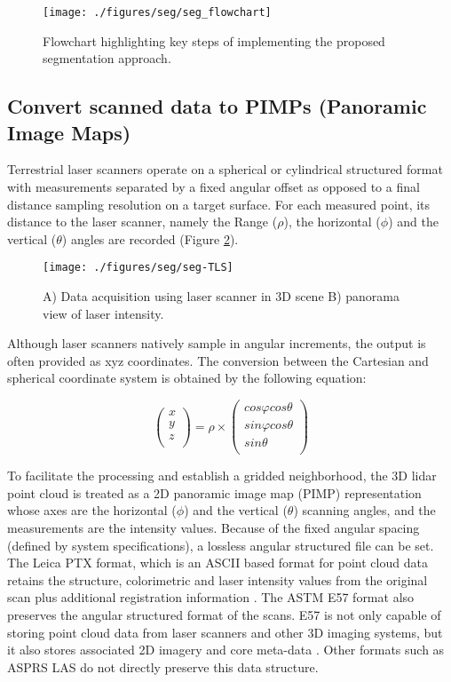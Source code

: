 \documentclass[final,3p,times,twocolumn,authoryear]{elsarticle}
\begin{document}
\begin{figure}
	\centering
	\texttt{[image: ./figures/seg/seg\_flowchart]}
	\caption{Flowchart highlighting key steps of implementing the proposed segmentation approach.}
	\label{fig:seg_flowchart}
\end{figure}


\subsection{Convert scanned data to PIMPs (Panoramic Image Maps)}

Terrestrial laser scanners operate on a spherical or cylindrical structured format with measurements separated by a fixed angular offset as opposed to a final distance sampling resolution on a target surface. For each measured point, its distance to the laser scanner, namely the Range ($\rho$), the horizontal ($\phi$) and the vertical ($\theta$) angles are recorded (Figure \ref{fig:seg-TLS}).

\begin{figure}
	\centering
	\texttt{[image: ./figures/seg/seg-TLS]}
	\caption{A) Data acquisition using laser scanner in 3D scene B) panorama view of laser intensity.}
	\label{fig:seg-TLS}
\end{figure}

Although laser scanners natively sample in angular increments, the output is often provided as xyz coordinates. The conversion between the Cartesian and spherical coordinate system is obtained by the following equation: 

\begin{equation}
\left( \begin{matrix}
x  \\
y  \\
z  \\
\end{matrix} \right)=\rho \times \left( \begin{matrix}
cos\varphi cos\theta   \\
sin\varphi cos\theta   \\
sin\theta   \\
\end{matrix} \right)
\end{equation}

To facilitate the processing and establish a gridded neighborhood, the 3D lidar point cloud is treated as a 2D panoramic image map (PIMP) representation whose axes are the horizontal ($\phi$) and the vertical ($\theta$) scanning angles, and the measurements are the intensity values. Because of the fixed angular spacing (defined by system specifications), a lossless angular structured file can be set. The Leica PTX format, which is an ASCII based format for point cloud data retains the structure, colorimetric and laser intensity values from the original scan plus additional registration information \cite{cyclone}. The ASTM E57 format also preserves the angular structured format of the scans. E57 is not only capable of storing point cloud data from laser scanners and other 3D imaging systems, but it also stores associated 2D imagery and core meta-data \cite{huber2011}. Other formats such as ASPRS LAS do not directly preserve this data structure.
\end{document}
